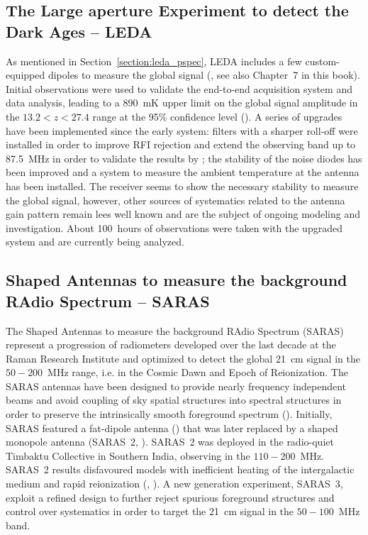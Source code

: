 \subsection{The Large aperture Experiment to detect the Dark Ages -- LEDA}
\label{leda_global}
As mentioned in Section~\ref{section:leda_pspec}, LEDA includes a few custom-equipped dipoles to measure the global signal (\cite{price18}, see also Chapter~7 in this book). Initial observations were used to validate the end-to-end acquisition system and data analysis, leading to a 890~mK upper limit on the global signal amplitude in the $13.2 < z < 27.4$ range at the 95\% confidence level (\cite{bernardi16}). A series of upgrades have been implemented since the early system: filters with a sharper roll-off were installed in order to improve RFI rejection and extend the observing band up to 87.5~MHz in order to validate the results by \cite{bowman18}; the stability of the noise diodes has been improved and a system to measure the ambient temperature at the antenna has been installed. The receiver seems to show the necessary stability to measure the global signal, however, other sources of systematics related to the antenna gain pattern remain lees well known and are the subject of ongoing modeling and investigation.
%
About 100~hours of observations were taken with the upgraded system and are currently being analyzed.
%


\subsection{Shaped Antennas to measure the background RAdio Spectrum -- SARAS}

The Shaped Antennas to measure the background RAdio Spectrum (SARAS) represent a progression of radiometers developed over the last decade at the Raman Research Institute and optimized to detect the global 21~cm signal in the $50-200$~MHz range, i.e. in the Cosmic Dawn and Epoch of Reionization.
%
The SARAS antennas have been designed to provide nearly frequency independent beams and avoid coupling of sky spatial structures into spectral structures in order to preserve the intrinsically smooth foreground spectrum (\cite{sathyanarayana17}).
%
Initially, SARAS featured a fat-dipole antenna (\cite{patra13}) that was later replaced by a shaped monopole antenna (SARAS~2, \cite{singh18a}). SARAS~2 was deployed in the radio-quiet Timbaktu Collective in Southern India, observing in the $110-200$~MHz. SARAS~2 results disfavoured models with inefficient heating of the intergalactic medium and rapid reionization (\cite{singh17}, \cite{singh18b}). 
A new generation experiment, SARAS~3, exploit a refined design to further reject spurious foreground structures and control over systematics in order to target the 21~cm signal in the $50-100$~MHz band.


